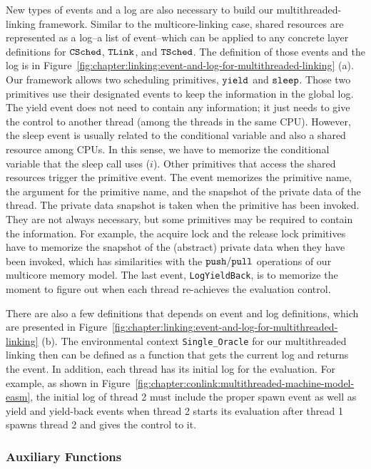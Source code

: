 New types of  events and a log  are also necessary to build our multithreaded-linking framework. 
Similar to the multicore-linking case, 
shared resources are represented as a log--a list of event--which can be applied to any concrete layer definitions for 
${{\mathrm{\texttt{CSched}}}}$, ${{\mathrm{\texttt{TLink}}}}$, and ${{\mathrm{\texttt{TSched}}}}$.
The definition of those events and the log is in Figure~\ref{fig:chapter:linking:event-and-log-for-multithreaded-linking} (a).
Our framework allows two scheduling primitives, 
${\mathrm{\texttt{yield}}}$ and ${\mathrm{\texttt{sleep}}}$. 
Those two primitives use their designated events to keep the information in the global log. 
The yield event does not need to contain any information; it just needs to give the control
to another thread (among the threads in the same CPU). 
However, the sleep event is usually related to the conditional variable and also a shared resource among CPUs.
In this sense, we have to memorize the conditional variable that the sleep call uses ($i$).
Other primitives that access the shared resources trigger the primitive event. 
The event memorizes the primitive name, the argument for the primitive name,
and the snapshot of the private data of the thread.
The private data snapshot is taken  when the primitive has been invoked. 
They are not always necessary, but some primitives may be required to contain the information.
For example, the acquire lock and the release lock primitives have to memorize the snapshot of the (abstract) private data when they have been invoked, which has similarities with the ${\mathrm{\texttt{push}}}/{\mathrm{\texttt{pull}}}$ operations of our multicore memory model. 
The last event, \lstinline$LogYieldBack$, is to memorize the moment to figure out when each thread re-achieves the evaluation control. 

There are also a few definitions that depends on event and log definitions, which are presented in Figure~\ref{fig:chapter:linking:event-and-log-for-multithreaded-linking} (b).
The environmental context \lstinline$Single_Oracle$  for our multithreaded linking
then can be defined as a function that gets the current log and returns the event. 
In addition,
each thread has its initial log for the evaluation. 
For example, as shown in Figure~\ref{fig:chapter:conlink:multithreaded-machine-model-easm},
the initial log of thread 2 must include the proper spawn event as well as yield and yield-back events
when thread 2 starts its evaluation after thread 1 spawns  thread 2 and gives the control to it.

\subsubsection{Auxiliary Functions}


